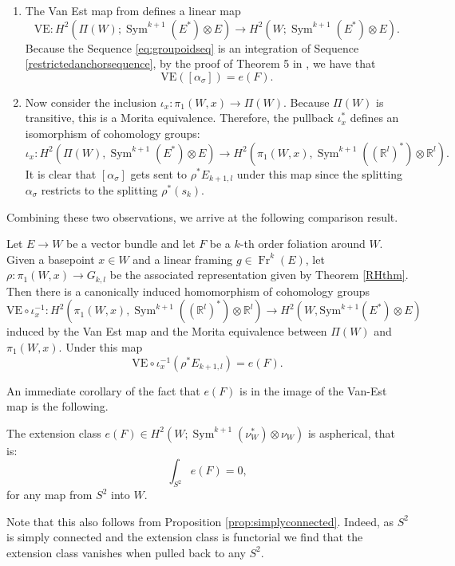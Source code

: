 \documentclass[10pt]{amsart}
\newcommand{\Fr}{{\operatorname{Fr}}}
\newcommand{\rr}{\mathbb{R}}
\DeclareMathOperator{\Sym}{Sym}
\numberwithin{theoremalpha}{section}
\numberwithin{equation}{section}
\numberwithin{definition}{section}
\numberwithin{theorem}{section}
\numberwithin{proposition}{section}
\numberwithin{lemma}{section}
\numberwithin{example}{section}
\numberwithin{remark}{section}
\numberwithin{corollary}{section}
\numberwithin{question}{section}
\numberwithin{problem}{section}
\numberwithin{assumption}{section}
\theoremstyle{named}
\numberwithin{equation}{section}
\begin{document}
\begin{enumerate}
\item The Van Est map from \cite{MR1103911} defines a linear map 
\[
\mathrm{VE}: H^2(\Pi(W);\Sym^{k+1}(E^*)\otimes E) \rightarrow H^2(W;\Sym^{k+1}(E^*)\otimes E).
\]
Because the Sequence \ref{eq:groupoidseq} is an integration of Sequence \ref{restrictedanchorsequence}, by the proof of Theorem 5 in \cite{cra03}, we have that \[ \mathrm{VE}([\alpha_{\sigma}] ) = e(F). \]
\item Now consider the inclusion $\iota_x : \pi_{1}(W, x) \to \Pi(W)$. Because $\Pi(W)$ is transitive, this is a Morita equivalence. Therefore, the pullback $\iota_{x}^*$ defines an isomorphism of cohomology groups: 
\[
\iota_{x} : H^{2}(\Pi(W), \Sym^{k+1}(E^*)\otimes E) \to H^{2}(\pi_{1}(W, x), \Sym^{k+1}((\rr^{l})^*) \otimes \rr^l). 
\]
It is clear that $[\alpha_{\sigma}] $ gets sent to $\rho^*E_{k+1,l} $ under this map since the splitting $\alpha_{\sigma}$ restricts to the splitting $\rho^*(s_{k})$. 
\end{enumerate}

Combining these two observations, we arrive at the following comparison result. 

\begin{proposition} \label{ComparisonmapVE}
Let $E \to W$ be a vector bundle and let $F$ be a $k$-th order foliation around $W$. Given a basepoint $x \in W$ and a linear framing $g \in \Fr^k(E)$, let $\rho : \pi_{1}(W, x) \to G_{k,l}$ be the associated representation given by Theorem \ref{RHthm}. Then there is a canonically induced homomorphism of cohomology groups 
\[
\mathrm{VE} \circ  \iota_{x}^{-1} : H^2(\pi_1(W,x),\Sym^{k+1}((\rr^{l})^*) \otimes \rr^l) \to H^{2}(W, \mathrm{Sym}^{k+1}(E^*) \otimes E)
\]
induced by the Van Est map and the Morita equivalence between $\Pi(W)$ and $\pi_{1}(W,x)$. Under this map 
\[
\mathrm{VE} \circ  \iota_{x}^{-1} (\rho^*E_{k+1,l} ) = e(F). 
\]
\end{proposition}
An immediate corollary of the fact that $e(F)$ is in the image of the Van-Est map is the following. 
\begin{corollary} \label{cor:asphericalperiods}
The extension class $e(F) \in H^2(W;\Sym^{k+1}(\nu_W^*) \otimes \nu_W)$ is aspherical, that is:
\begin{equation*}
\int_{S^2} e(F) = 0,
\end{equation*}
for any map from $S^2$ into $W$.
\end{corollary}
Note that this also follows from Proposition \ref{prop:simplyconnected}. Indeed, as $S^2$ is simply connected and the extension class is functorial we find that the extension class vanishes when pulled back to any $S^2$.
\end{document}

